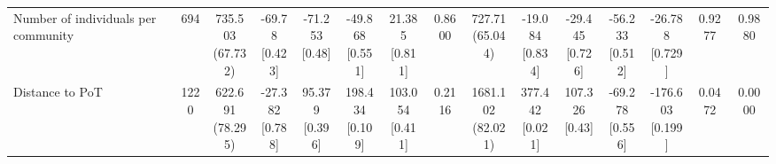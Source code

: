 \documentclass[
]{article}
\begin{document}
\begin{table}
{\begin{tabular}[t]{lcccccccccccccc}
\hspace{1em}Number of individuals per community & 694 & \makecell[c]{735.503\\(67.732)} & \makecell[c]{-69.78\\{[0.423]}} & \makecell[c]{-71.253\\{[0.48]}} & \makecell[c]{-49.868\\{[0.551]}} & \makecell[c]{21.385\\{[0.811]}} & 0.8600 & \makecell[c]{727.71\\(65.044)} & \makecell[c]{-19.084\\{[0.834]}} & \makecell[c]{-29.445\\{[0.726]}} & \makecell[c]{-56.233\\{[0.512]}} & \makecell[c]{-26.788\\{[0.729]}} & 0.9277 & 0.9880\\
\hspace{1em}Distance to PoT & 1220 & \makecell[c]{622.691\\(78.295)} & \makecell[c]{-27.382\\{[0.788]}} & \makecell[c]{95.379\\{[0.396]}} & \makecell[c]{198.434\\{[0.109]}} & \makecell[c]{103.054\\{[0.411]}} & 0.2116 & \makecell[c]{1681.102\\(82.021)} & \makecell[c]{377.442\\{[0.021]}} & \makecell[c]{107.326\\{[0.43]}} & \makecell[c]{-69.278\\{[0.556]}} & \makecell[c]{-176.603\\{[0.199]}} & 0.0472 & 0.0000\\
\bottomrule
\end{tabular}}
\end{table}
\end{document}
